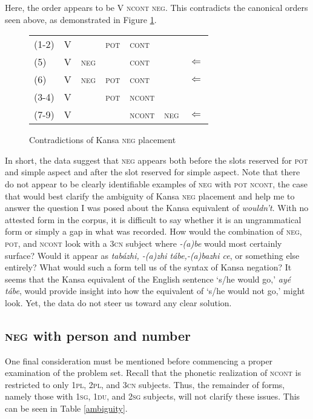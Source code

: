 \documentclass[output=paper]{LSP/langsci}
\begin{document}
Here, the order appears to be V \textsc{ncont neg}. This contradicts the canonical orders seen above, as demonstrated in Figure \ref{contradictions}.

\begin{figure}
\caption{Contradictions of Kansa \textsc{neg} placement} \label{contradictions}
\begin{tabular}{ l l l l l l l }
(1-2) & V & & \textsc{pot} & \textsc{cont} & & \\
(5) & V & \textsc{neg} & & \textsc{cont} & & $\Leftarrow$ \\
(6) & V & \textsc{neg} & \textsc{pot} & \textsc{cont} & & $\Leftarrow$ \\
(3-4) & V & & \textsc{pot} & \textsc{ncont} & & \\
(7-9) & V & & & \textsc{ncont} & \textsc{neg} & $\Leftarrow$ \\
\end{tabular}
\end{figure}

In short, the data suggest that \textsc{neg} appears both before the slots reserved for \textsc{pot} and simple aspect and after the slot reserved for simple aspect. Note that there do not appear to be clearly identifiable examples of \textsc{neg} with \textsc{pot ncont}, the case that would best clarify the ambiguity of Kansa \textsc{neg} placement and help me to answer the question I was posed about the Kansa equivalent of \textit{wouldn't}. With no attested form in the corpus, it is difficult to say whether it is an ungrammatical form or simply a gap in what was recorded. How would the combination of \textsc{neg}, \textsc{pot}, and \textsc{ncont} look with a \textsc{3cn} subject where \textit{-(a)be} would most certainly surface? Would it appear as \textit{tab\'azhi, -(a)zhi t\'abe,-(a)bazhi ce}, or something else entirely? What would such a form tell us of the syntax of Kansa negation? It seems that the Kansa equivalent of the English sentence `s/he would go,' \textit{ay\'e t\'abe}, would provide insight into how the equivalent of `s/he would not go,' might look. Yet, the data do not steer us toward any clear solution.

\subsection{\textsc{neg} with person and number}
One final consideration must be mentioned before commencing a proper examination of the problem set. Recall that the phonetic realization of \textsc{ncont} is restricted to only \textsc{1pl, 2pl}, and \textsc{3cn} subjects. Thus, the remainder of forms, namely those with \textsc{1sg, 1du}, and \textsc{2sg} subjects, will not clarify these issues. This can be seen in Table \ref{ambiguity}.
\end{document}
